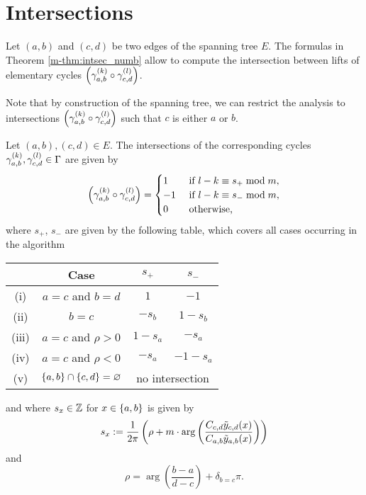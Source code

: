 \documentclass[main.tex]{subfiles}
\begin{document}
  \section{Intersections}\label{sec:intersections}

   Let $(a,b)$ and $(c,d)$ be two edges of the spanning tree $E$.
  The formulas in Theorem \ref{m-thm:intsec_numb} allow to compute the intersection
  between lifts of elementary cycles $\left(\gamma_{a,b}^{(k)} \circ \gamma_{c,d}^{(l)}\right)$.

  Note that by construction of the spanning tree,
  we can restrict the analysis to intersections $\left(\gamma_{a,b}^{(k)} \circ \gamma_{c,d}^{(l)}\right)$ 
  such that $c$ is either $a$ or $b$.

   \begin{thm}\label{thm:intsec_numb}
      Let $(a,b),(c,d) \in E$. The intersections of the corresponding cycles $\gamma_{a,b}^{(k)}, \gamma_{c,d}^{(l)} \in \Gamma$ are given by
      \begin{equation*}
          \left(\gamma_{a,b}^{(k)} \circ \gamma_{c,d}^{(l)}\right)
          = \begin{cases}
              1  &\text{ if } l-k \equiv s_+ \bmod m,\\
              -1 &\text{ if } l-k \equiv s_- \bmod m,\\
              0 &\text{ otherwise,}
          \end{cases}
      \end{equation*}
      where $s_+$, $s_-$ are given by the following table, which covers all
      cases occurring in the algorithm
      \begin{center}
          \normalfont
      \begin{tabular}{cccc}
          \toprule
          & Case & $s_+$ & $s_-$ \\
          \midrule
         (i) & $a=c$ and $b=d$ & $1$ & $-1$ \\
         (ii) & $b=c$ & $-s_b$ & $1-s_b$ \\
         (iii) & $a=c$ and $\rho>0$ & $1-s_a$ & $-s_a$ \\
         (iv) & $a=c$ and $\rho<0$ & $-s_a$ & $-1-s_a$\\
         (v) & $\left\{a,b\right\}\cap\left\{c,d\right\}=\varnothing$ & \multicolumn{2}{c}{no intersection} \\
          \bottomrule
      \end{tabular}
      \end{center}
      and where $s_x \in \mathbb{Z}$ for $x\in\left\{a,b\right\}$ is given by
      \begin{equation}\label{eq:s_x}
	    s_x := \frac{1}{2\pi}\left( \rho + m \cdot \arg \left( \frac{C_{c,d} \tilde{y}_{c,d}(x)}{C_{a,b}\tilde{y}_{a,b}(x)} \right) 
	    \right)
      \end{equation}
     and
      \begin{equation*}
          \rho = \arg \left( \frac{b-a}{d-c} \right) + \delta_{b=c}\pi.
      \end{equation*}
 \end{thm}
\end{document}
